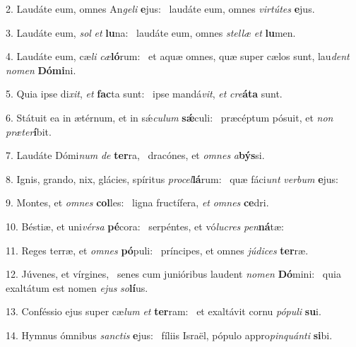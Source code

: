 2. Laudáte eum, omnes An\textit{ge}\textit{li} \textbf{e}jus: \ast\  laudáte eum, omnes \textit{vir}\textit{tú}\textit{tes} \textbf{e}jus.\

3. Laudáte eum, \textit{sol} \textit{et} \textbf{lu}na: \ast\  laudáte eum, omnes \textit{stel}\textit{læ} \textit{et} \textbf{lu}men.\

4. Laudáte eum, cæ\textit{li} \textit{cæ}\textbf{ló}rum: \ast\  et aquæ omnes, quæ super cælos sunt, lau\textit{dent} \textit{no}\textit{men} \textbf{Dó}\textbf{mi}ni.\

5. Quia ipse di\textit{xit}, \textit{et} \textbf{fac}ta sunt: \ast\  ipse mandá\textit{vit}, \textit{et} \textit{cre}\textbf{á}\textbf{ta} sunt.\

6. Státuit ea in ætérnum, et in sǽ\textit{cu}\textit{lum} \textbf{sǽ}culi: \ast\  præcéptum pósuit, et \textit{non} \textit{præ}\textit{ter}\textbf{í}bit.\

7. Laudáte Dómi\textit{num} \textit{de} \textbf{ter}ra, \ast\  dracónes, et \textit{om}\textit{nes} \textit{a}\textbf{býs}si.\

8. Ignis, grando, nix, glácies, spíritus \textit{pro}\textit{cel}\textbf{lá}rum: \ast\  quæ fáci\textit{unt} \textit{ver}\textit{bum} \textbf{e}jus:\

9. Montes, et \textit{om}\textit{nes} \textbf{col}les: \ast\  ligna fructífera, \textit{et} \textit{om}\textit{nes} \textbf{ce}dri.\

10. Béstiæ, et uni\textit{vér}\textit{sa} \textbf{pé}cora: \ast\  serpéntes, et vó\textit{lu}\textit{cres} \textit{pen}\textbf{ná}tæ:\

11. Reges terræ, et \textit{om}\textit{nes} \textbf{pó}puli: \ast\  príncipes, et omnes \textit{jú}\textit{di}\textit{ces} \textbf{ter}ræ.\

12. Júvenes, et vírgines, \dag\  senes cum junióribus laudent \textit{no}\textit{men} \textbf{Dó}mini: \ast\  quia exaltátum est nomen \textit{e}\textit{jus} \textit{so}\textbf{lí}us.\

13. Conféssio ejus super cæ\textit{lum} \textit{et} \textbf{ter}ram: \ast\  et exaltávit cornu \textit{pó}\textit{pu}\textit{li} \textbf{su}i.\

14. Hymnus ómnibus \textit{sanc}\textit{tis} \textbf{e}jus: \ast\  fíliis Israël, pópulo appro\textit{pin}\textit{quán}\textit{ti} \textbf{si}bi.\

